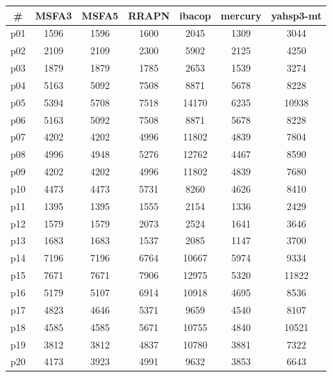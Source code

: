 \begin{tabular}{ccccccc}
\toprule
\textbf{\#} & \textbf{MSFA3} & \textbf{MSFA5} & \textbf{RRAPN} & \textbf{ibacop} & \textbf{mercury} & \textbf{yahsp3-mt}\\
\midrule
p01 & 1596 & 1596 & 1600 & 2045 & 1309 & 3044\\
p02 & 2109 & 2109 & 2300 & 5902 & 2125 & 4250\\
p03 & 1879 & 1879 & 1785 & 2653 & 1539 & 3274\\
p04 & 5163 & 5092 & 7508 & 8871 & 5678 & 8228\\
p05 & 5394 & 5708 & 7518 & 14170 & 6235 & 10938\\
p06 & 5163 & 5092 & 7508 & 8871 & 5678 & 8228\\
p07 & 4202 & 4202 & 4996 & 11802 & 4839 & 7804\\
p08 & 4996 & 4948 & 5276 & 12762 & 4467 & 8590\\
p09 & 4202 & 4202 & 4996 & 11802 & 4839 & 7680\\
p10 & 4473 & 4473 & 5731 & 8260 & 4626 & 8410\\
p11 & 1395 & 1395 & 1555 & 2154 & 1336 & 2429\\
p12 & 1579 & 1579 & 2073 & 2524 & 1641 & 3646\\
p13 & 1683 & 1683 & 1537 & 2085 & 1147 & 3700\\
p14 & 7196 & 7196 & 6764 & 10667 & 5974 & 9334\\
p15 & 7671 & 7671 & 7906 & 12975 & 5320 & 11822\\
p16 & 5179 & 5107 & 6914 & 10918 & 4695 & 8536\\
p17 & 4823 & 4646 & 5371 & 9659 & 4540 & 8107\\
p18 & 4585 & 4585 & 5671 & 10755 & 4840 & 10521\\
p19 & 3812 & 3812 & 4837 & 10780 & 3881 & 7322\\
p20 & 4173 & 3923 & 4991 & 9632 & 3853 & 6643\\
\bottomrule
\end{tabular}

